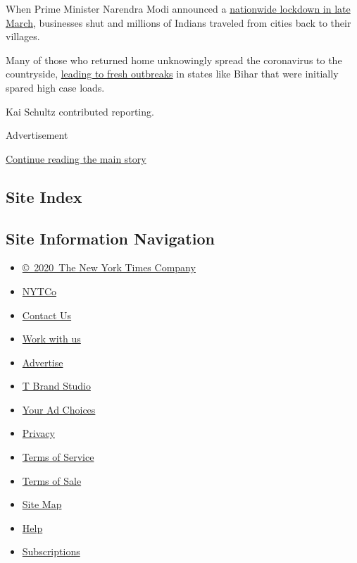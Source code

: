 When Prime Minister Narendra Modi announced a
\href{https://www.nytimes.com/2020/03/29/world/asia/coronavirus-india-migrants.html}{nationwide
lockdown in late March}, businesses shut and millions of Indians
traveled from cities back to their villages.

Many of those who returned home unknowingly spread the coronavirus to
the countryside,
\href{https://indianexpress.com/article/india/coronavirus-migrants-back-in-bihar-show-high-positivity-1-in-4-tested-from-delhi-6416531/}{leading
to fresh outbreaks} in states like Bihar that were initially spared high
case loads.

Kai Schultz contributed reporting.

Advertisement

\protect\hyperlink{after-bottom}{Continue reading the main story}

\hypertarget{site-index}{%
\subsection{Site Index}\label{site-index}}

\hypertarget{site-information-navigation}{%
\subsection{Site Information
Navigation}\label{site-information-navigation}}

\begin{itemize}
\tightlist
\item
  \href{https://help.nytimes.com/hc/en-us/articles/115014792127-Copyright-notice}{©~2020~The
  New York Times Company}
\end{itemize}

\begin{itemize}
\tightlist
\item
  \href{https://www.nytco.com/}{NYTCo}
\item
  \href{https://help.nytimes.com/hc/en-us/articles/115015385887-Contact-Us}{Contact
  Us}
\item
  \href{https://www.nytco.com/careers/}{Work with us}
\item
  \href{https://nytmediakit.com/}{Advertise}
\item
  \href{http://www.tbrandstudio.com/}{T Brand Studio}
\item
  \href{https://www.nytimes.com/privacy/cookie-policy\#how-do-i-manage-trackers}{Your
  Ad Choices}
\item
  \href{https://www.nytimes.com/privacy}{Privacy}
\item
  \href{https://help.nytimes.com/hc/en-us/articles/115014893428-Terms-of-service}{Terms
  of Service}
\item
  \href{https://help.nytimes.com/hc/en-us/articles/115014893968-Terms-of-sale}{Terms
  of Sale}
\item
  \href{https://spiderbites.nytimes.com}{Site Map}
\item
  \href{https://help.nytimes.com/hc/en-us}{Help}
\item
  \href{https://www.nytimes.com/subscription?campaignId=37WXW}{Subscriptions}
\end{itemize}

